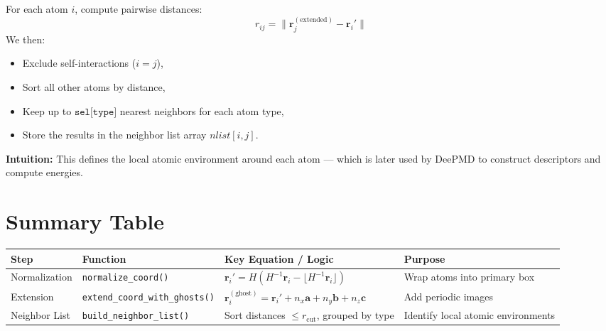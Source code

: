 \documentclass[12pt,a4paper]{article}
\begin{document}
For each atom $i$, compute pairwise distances:
\[
r_{ij} = \| \mathbf{r}_j^{(\text{extended})} - \mathbf{r}_i' \|
\]
We then:
\begin{itemize}
    \item Exclude self-interactions ($i = j$),
    \item Sort all other atoms by distance,
    \item Keep up to $\texttt{sel[type]}$ nearest neighbors for each atom type,
    \item Store the results in the neighbor list array $nlist[i, j]$.
\end{itemize}

\textbf{Intuition:}  
This defines the local atomic environment around each atom — which is later used by DeePMD to construct descriptors and compute energies.

\bigskip

\section*{Summary Table}

\begin{center}
\begin{tabular}{|>{\raggedright\arraybackslash}p{2.5cm}|>{\raggedright\arraybackslash}p{3.5cm}|>{\raggedright\arraybackslash}p{5cm}|>{\raggedright\arraybackslash}p{3cm}|}
\hline
\textbf{Step} & \textbf{Function} & \textbf{Key Equation / Logic} & \textbf{Purpose} \\
\hline
Normalization & \texttt{normalize\_coord()} & $\mathbf{r}_i' = H(H^{-1}\mathbf{r}_i - \lfloor H^{-1}\mathbf{r}_i \rfloor)$ & Wrap atoms into primary box \\
\hline
Extension & \texttt{extend\_coord\_with\_ghosts()} & $\mathbf{r}_i^{(\text{ghost})} = \mathbf{r}_i' + n_x\mathbf{a}+n_y\mathbf{b}+n_z\mathbf{c}$ & Add periodic images \\
\hline
Neighbor List & \texttt{build\_neighbor\_list()} & Sort distances $\leq r_{\text{cut}}$, grouped by type & Identify local atomic environments \\
\hline
\end{tabular}
\end{center}
\end{document}
